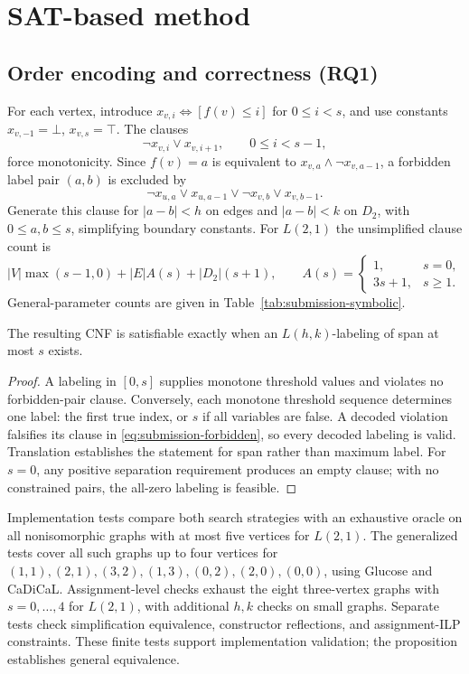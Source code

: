 \section{SAT-based method}
\label{sec:submission-method}
\subsection{Order encoding and correctness (RQ1)}
For each vertex, introduce $x_{v,i}\Leftrightarrow[f(v)\leq i]$ for
$0\leq i<s$, and use constants $x_{v,-1}=\bot$, $x_{v,s}=\top$.
The clauses
\begin{equation}
 \neg x_{v,i}\lor x_{v,i+1},\qquad 0\leq i<s-1,
\end{equation}
force monotonicity. Since $f(v)=a$ is equivalent to
$x_{v,a}\land\neg x_{v,a-1}$, a forbidden label pair $(a,b)$ is excluded by
\begin{equation}\label{eq:submission-forbidden}
 \neg x_{u,a}\lor x_{u,a-1}\lor\neg x_{v,b}\lor x_{v,b-1}.
\end{equation}
Generate this clause for $|a-b|<h$ on edges and $|a-b|<k$ on $D_2$,
with $0\leq a,b\leq s$, simplifying boundary constants.
For $L(2,1)$ the unsimplified clause count is
\[
 |V|\max(s-1,0)+|E|A(s)+|D_2|(s+1),\qquad
 A(s)=\begin{cases}1,&s=0,\\3s+1,&s\geq1.\end{cases}
\]
General-parameter counts are given in Table~\ref{tab:submission-symbolic}.


\begin{proposition}\label{prop:submission-encoding}
The resulting CNF is satisfiable exactly when an $L(h,k)$-labeling of
span at most $s$ exists.
\end{proposition}
\begin{proof}
A labeling in $[0,s]$ supplies monotone threshold values and violates no
forbidden-pair clause. Conversely, each monotone threshold sequence
determines one label: the first true index, or $s$ if all variables are
false. A decoded violation falsifies its clause in
\eqref{eq:submission-forbidden}, so every decoded labeling is valid.
Translation establishes the statement for span rather than maximum label.
For $s=0$, any positive separation requirement produces an empty clause;
with no constrained pairs, the all-zero labeling is feasible.
\end{proof}

Implementation tests compare both search strategies with an exhaustive
oracle on all nonisomorphic graphs with at most five vertices for $L(2,1)$.
The generalized tests cover all such graphs up to four vertices for
$(1,1),(2,1),(3,2),(1,3),(0,2),(2,0),(0,0)$, using Glucose and CaDiCaL.
Assignment-level checks exhaust the eight three-vertex graphs with
$s=0,\ldots,4$ for $L(2,1)$, with additional $h,k$ checks on small graphs.
Separate tests check simplification equivalence, constructor reflections,
and assignment-ILP constraints. These finite tests support implementation
validation; the proposition establishes general equivalence.



